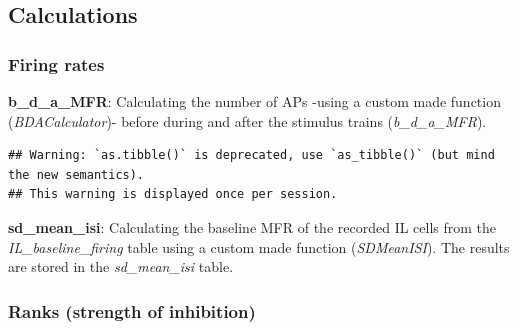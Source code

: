 \documentclass[12pt,]{article}
\newenvironment{Shaded}{\begin{snugshade}}{\end{snugshade}}
\newcommand{\DataTypeTok}[1]{\textcolor[rgb]{0.13,0.29,0.53}{#1}}
\newcommand{\KeywordTok}[1]{\textcolor[rgb]{0.13,0.29,0.53}{\textbf{#1}}}
\newcommand{\NormalTok}[1]{#1}
\newcommand{\OperatorTok}[1]{\textcolor[rgb]{0.81,0.36,0.00}{\textbf{#1}}}
\newcommand{\StringTok}[1]{\textcolor[rgb]{0.31,0.60,0.02}{#1}}
\begin{document}
\hypertarget{htmlwidget-a001e3e2cbab664722e2}{}

\hypertarget{calculations}{%
\subsection{Calculations}\label{calculations}}

\hypertarget{firing-rates}{%
\subsubsection{Firing rates}\label{firing-rates}}

\textbf{b\_d\_a\_MFR}: Calculating the number of APs -using a custom
made function (\emph{BDACalculator})- before during and after the
stimulus trains (\emph{b\_d\_a\_MFR}).

\begin{Shaded}
\end{Shaded}

\begin{verbatim}
## Warning: `as.tibble()` is deprecated, use `as_tibble()` (but mind the new semantics).
## This warning is displayed once per session.
\end{verbatim}

\textbf{sd\_mean\_isi}: Calculating the baseline MFR of the recorded IL
cells from the \emph{IL\_baseline\_firing} table using a custom made
function (\emph{SDMeanISI}). The results are stored in the
\emph{sd\_mean\_isi} table.

\hypertarget{ranks-strength-of-inhibition}{%
\subsubsection{Ranks (strength of
inhibition)}\label{ranks-strength-of-inhibition}}
\end{document}
